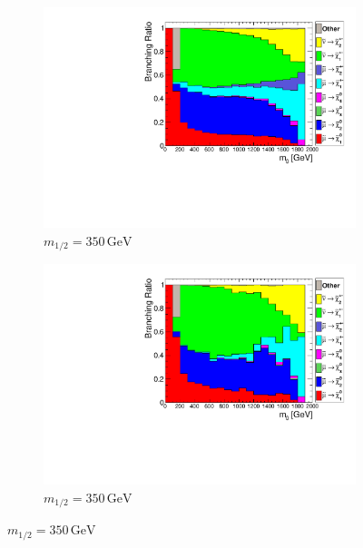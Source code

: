 \begin{figure}[ht!]
  \centering
  \begin{subfigure}[b]{0.495\textwidth}
    \centering
    \includegraphics[width=\textwidth]{plots/hCrossRatio350.pdf}
    \caption{$m_{1/2} = 350\,\text{GeV}$\label{fig:crossratio350}}
  \end{subfigure}
  \begin{subfigure}[b]{0.495\textwidth}
    \centering
    \includegraphics[width=\textwidth]{plots/hCutCrossRatio350.pdf}
    \caption{$m_{1/2} = 350\,\text{GeV}$\label{fig:cutcrossratio350}}
  \end{subfigure}


\end{figure}
